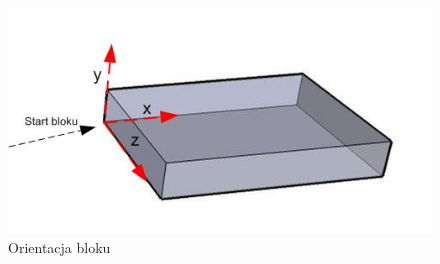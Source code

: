  \begin{figure}
\begin{center}
\includegraphics{osie.jpg} 
\caption { Orientacja bloku}
\label {osie}
\end{center}
\end{figure}

